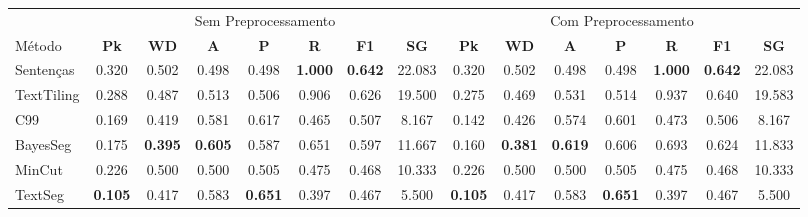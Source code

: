 \documentclass{article}
\begin{document}
 
\begin{longtable}[c]{|l|c|c|c|c|c|c|c||c|c|c|c|c|c|c|} 
\hline 
&\multicolumn{7}{c||}{Sem Preprocessamento} & \multicolumn{7}{c|}{Com Preprocessamento}\\ 
M\'{e}todo & \textbf{Pk} & \textbf{WD} & \textbf{A } & \textbf{P } & \textbf{R } & \textbf{F1} & \textbf{SG} & \textbf{Pk} & \textbf{WD} & \textbf{A } & \textbf{P } & \textbf{R } & \textbf{F1} & \textbf{SG}\\ \hline
Senten\c{c}as & 0.320 & 0.502 & 0.498 & 0.498 & \textbf{1.000} & \textbf{0.642} & 22.083 & 0.320 & 0.502 & 0.498 & 0.498 & \textbf{1.000} & \textbf{0.642} & 22.083\\ \hline
TextTiling & 0.288 & 0.487 & 0.513 & 0.506 & 0.906 & 0.626 & 19.500 & 0.275 & 0.469 & 0.531 & 0.514 & 0.937 & 0.640 & 19.583\\ \hline
C99 & 0.169 & 0.419 & 0.581 & 0.617 & 0.465 & 0.507 & 8.167 & 0.142 & 0.426 & 0.574 & 0.601 & 0.473 & 0.506 & 8.167\\ \hline
BayesSeg & 0.175 & \textbf{0.395} & \textbf{0.605} & 0.587 & 0.651 & 0.597 & 11.667 & 0.160 & \textbf{0.381} & \textbf{0.619} & 0.606 & 0.693 & 0.624 & 11.833\\ \hline
MinCut & 0.226 & 0.500 & 0.500 & 0.505 & 0.475 & 0.468 & 10.333 & 0.226 & 0.500 & 0.500 & 0.505 & 0.475 & 0.468 & 10.333\\ \hline
TextSeg & \textbf{0.105} & 0.417 & 0.583 & \textbf{0.651} & 0.397 & 0.467 & 5.500 & \textbf{0.105} & 0.417 & 0.583 & \textbf{0.651} & 0.397 & 0.467 & 5.500\\ \hline
\end{longtable} 
\end{document}

